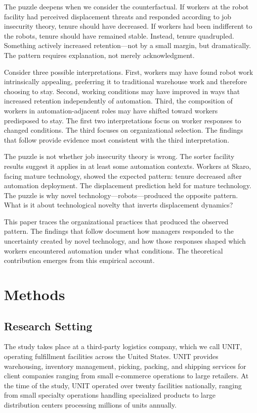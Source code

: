 \documentclass[12pt]{article}
\begin{document}
The puzzle deepens when we consider the counterfactual. If workers at the robot facility had perceived displacement threats and responded according to job insecurity theory, tenure should have decreased. If workers had been indifferent to the robots, tenure should have remained stable. Instead, tenure quadrupled. Something actively increased retention---not by a small margin, but dramatically. The pattern requires explanation, not merely acknowledgment.

Consider three possible interpretations. First, workers may have found robot work intrinsically appealing, preferring it to traditional warehouse work and therefore choosing to stay. Second, working conditions may have improved in ways that increased retention independently of automation. Third, the composition of workers in automation-adjacent roles may have shifted toward workers predisposed to stay. The first two interpretations focus on worker responses to changed conditions. The third focuses on organizational selection. The findings that follow provide evidence most consistent with the third interpretation.

The puzzle is not whether job insecurity theory is wrong. The sorter facility results suggest it applies in at least some automation contexts. Workers at Skaro, facing mature technology, showed the expected pattern: tenure decreased after automation deployment. The displacement prediction held for mature technology. The puzzle is why novel technology---robots---produced the opposite pattern. What is it about technological novelty that inverts displacement dynamics?

This paper traces the organizational practices that produced the observed pattern. The findings that follow document how managers responded to the uncertainty created by novel technology, and how those responses shaped which workers encountered automation under what conditions. The theoretical contribution emerges from this empirical account.

\section{Methods}

\subsection{Research Setting}

The study takes place at a third-party logistics company, which we call UNIT, operating fulfillment facilities across the United States. UNIT provides warehousing, inventory management, picking, packing, and shipping services for client companies ranging from small e-commerce operations to large retailers. At the time of the study, UNIT operated over twenty facilities nationally, ranging from small specialty operations handling specialized products to large distribution centers processing millions of units annually.
\end{document}
